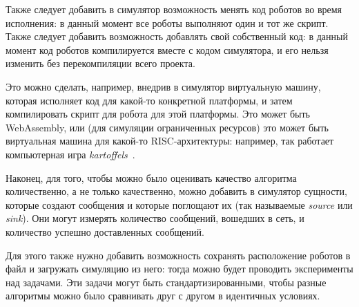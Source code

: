 \documentclass[%
]{article}
\begin{document}
Также следует добавить в симулятор
возможность менять код роботов во время исполнения:
в данный момент все роботы выполняют один и тот же скрипт.
Также следует добавить возможность добавлять свой собственный код:
в данный момент код роботов компилируется вместе с кодом симулятора,
и его нельзя изменить без перекомпиляции всего проекта.

Это можно сделать, например,
внедрив в симулятор виртуальную машину,
которая исполняет код для какой-то конкретной платформы,
и затем компилировать скрипт для робота для этой платформы.
Это может быть WebAssembly,
или (для симуляции ограниченных ресурсов)
это может быть виртуальная машина для какой-то RISC-архитектуры:
например, так работает компьютерная игра \emph{kartoffels}~\cite{kartoffels}.

Наконец, для того, чтобы можно было оценивать качество алгоритма
количественно, а не только качественно,
можно добавить в симулятор
сущности,
которые создают сообщения
и которые поглощают их
(так называемые \emph{source} или \emph{sink}).
Они могут измерять количество сообщений,
вошедших в сеть,
и количество успешно доставленных сообщений.

Для этого также нужно добавить возможность сохранять расположение роботов
в файл и загружать симуляцию из него:
тогда можно будет проводить эксперименты
над задачами.
Эти задачи могут быть стандартизированными,
чтобы разные алгоритмы можно было сравнивать друг с другом
в идентичных условиях.






\end{document}

